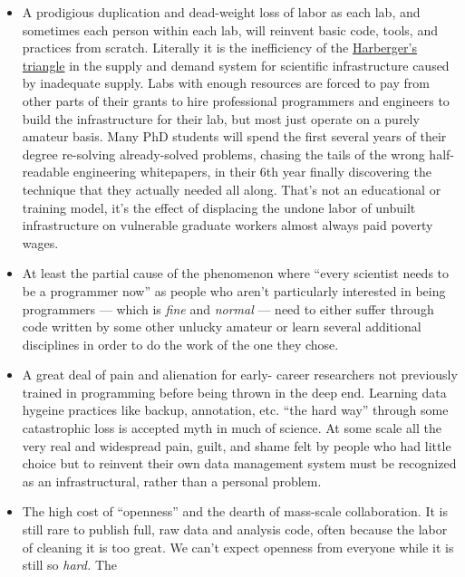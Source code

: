 \begin{itemize}

\item
  A prodigious duplication and dead-weight loss of labor as each lab,
  and sometimes each person within each lab, will reinvent basic code,
  tools, and practices from scratch. Literally it is the inefficiency of
  the
  \href{https://en.wikipedia.org/wiki/Deadweight_loss\#Harberger's_triangle}{Harberger's
  triangle} in the supply and demand system for scientific
  infrastructure caused by inadequate supply. Labs with enough resources
  are forced to pay from other parts of their grants to hire
  professional programmers and engineers to build the infrastructure for
  their lab, but
  most just operate on a purely amateur basis. Many PhD students will
  spend the first several years of their degree re-solving
  already-solved problems, chasing the tails of the wrong half-readable
  engineering whitepapers, in their 6th year finally discovering the
  technique that they actually needed all along. That's not an
  educational or training model, it's the effect of displacing the
  undone labor of unbuilt infrastructure on vulnerable graduate workers
  almost always paid poverty wages.
\item
  At least the partial cause of the phenomenon where ``every scientist
  needs to be a programmer now'' as people who aren't particularly
  interested in being programmers --- which is \emph{fine} and
  \emph{normal} --- need to either suffer through code written by some
  other unlucky amateur or learn several additional disciplines in order
  to do the work of the one they chose.
\item
  A great deal of pain and alienation for early- career researchers not
  previously trained in programming before being thrown in the deep end.
  Learning data hygeine practices like backup, annotation, etc. ``the
  hard way'' through some catastrophic loss is accepted myth in much of
  science. At some scale all the very real and widespread pain, guilt,
  and shame felt by people who had little choice but to reinvent their
  own data management system must be recognized as an infrastructural,
  rather than a personal problem.
\item
  The high cost of ``openness'' and the dearth of mass-scale
  collaboration. It is still rare to publish full, raw data and analysis
  code, often because the labor of cleaning it is too great. We can't
  expect openness from everyone while it is still so \emph{hard.} The

\end{itemize}
